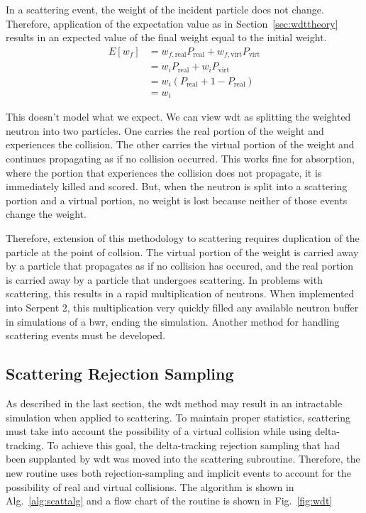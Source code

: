 In a scattering event, the weight of the incident particle does not
change. Therefore, application of the expectation value as in
Section~\ref{sec:wdttheory} results in an expected value of the final
weight equal to the initial weight.
\begin{align*}
  E[w_f] &= w_{f,\mathrm{real}}P_{\mathrm{real}} +
           w_{f,\mathrm{virt}}P_{\mathrm{virt}} \\
  &= w_iP_\mathrm{real} + w_iP_{\mathrm{virt}} \\
  &= w_i(P_\mathrm{real} + 1 -P_\mathrm{real}) \\
  &= w_i
\end{align*}

This doesn't model what we expect. We can view \gls{wdt} as splitting
the weighted neutron into two particles. One carries the real portion
of the weight and experiences the collision. The other carries the
virtual portion of the weight and continues propagating as if no
collision occurred. This works fine for absorption, where the portion
that experiences the collision does not propagate, it is immediately
killed and scored. But, when the neutron is split into a scattering
portion and a virtual portion, no weight is lost because neither of
those events change the weight.

Therefore, extension of this methodology to scattering requires duplication of
the particle at the point of collsion. The virtual portion of the
weight is carried away by a particle that propagates as if no
collision has occured, and the real portion is carried away by a
particle that undergoes scattering. In problems with scattering, this
results in a rapid multiplication of neutrons. When implemented into
Serpent 2, this multiplication very quickly filled any available
neutron buffer in simulations of a \gls{bwr}, ending
the simulation. Another method for handling scattering events must be
developed.

\subsection{Scattering Rejection Sampling}
\label{sec:scattering}

As described in the last section, the \gls{wdt} method may result in
an intractable simulation when applied to scattering. To maintain
proper statistics, scattering must take into account the possibility
of a virtual collision while using delta-tracking. To achieve this
goal, the delta-tracking rejection sampling that had been supplanted
by \gls{wdt} was moved into the scattering subroutine. Therefore, the
new routine uses both rejection-sampling and implicit events to
account for the possibility of real and virtual collisions. The
algorithm is shown in Alg.~\ref{alg:scattalg} and a flow chart of the
routine is shown in Fig.~\ref{fig:wdt}

